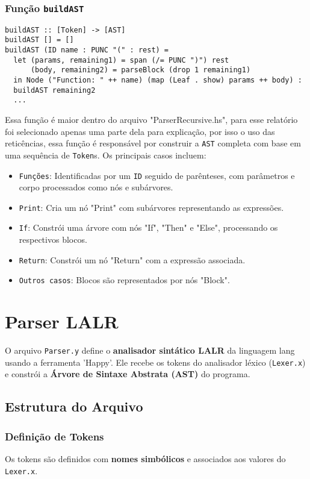 \documentclass{article}
\begin{document}
\subsubsection{Função \texttt{buildAST}}
\begin{verbatim}
buildAST :: [Token] -> [AST]
buildAST [] = []
buildAST (ID name : PUNC "(" : rest) =
  let (params, remaining1) = span (/= PUNC ")") rest
      (body, remaining2) = parseBlock (drop 1 remaining1)
  in Node ("Function: " ++ name) (map (Leaf . show) params ++ body) : 
  buildAST remaining2
  ...
\end{verbatim}

Essa função é maior dentro do arquivo "ParserRecursive.hs", para esse relatório foi selecionado apenas uma parte dela para explicação, por isso o uso das reticências, essa função é responsável por construir a \texttt{AST} completa com base em uma sequência de \texttt{Token}s. Os principais casos incluem:
\begin{itemize}
    \item \texttt{Funções}: Identificadas por um \texttt{ID} seguido de parênteses, com parâmetros e corpo processados como nós e subárvores.
    \item \texttt{Print}: Cria um nó "Print" com subárvores representando as expressões.
    \item \texttt{If}: Constrói uma árvore com nós "If", "Then" e "Else", processando os respectivos blocos.
    \item \texttt{Return}: Constrói um nó "Return" com a expressão associada.
    \item \texttt{Outros casos}: Blocos são representados por nós "Block".
\end{itemize}

\section{Parser LALR}

O arquivo \texttt{Parser.y} define o \textbf{analisador sintático LALR} da linguagem lang usando a ferramenta 'Happy'. Ele recebe os tokens do analisador léxico (\texttt{Lexer.x}) e constrói a \textbf{Árvore de Sintaxe Abstrata (AST)} do programa.

\subsection{Estrutura do Arquivo}

\subsubsection{Definição de Tokens}
Os tokens são definidos com \textbf{nomes simbólicos} e associados aos valores do \texttt{Lexer.x}.
\end{document}
